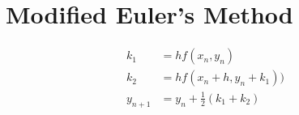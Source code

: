 \section{Modified Euler's Method}
	\begin{align}
		k_{1} &= hf(x_{n}, y_{n})& \\
		k_{2} &= hf(x_{n}+h, y_{n} + k_{1}))& \\
		y_{n+1} &= y_{n} + \frac{1}{2}(k_{1}+k_{2})&
	\end{align}
